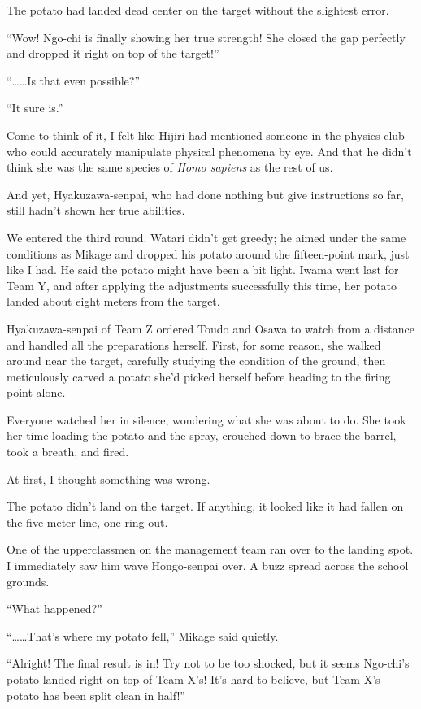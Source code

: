 \documentclass[
    a4paper,
    12pt,
    twoside,
    openany,
    UTF8,
    fontset=windows
]{ctexbook}
\begin{document}
The potato had landed dead center on the target without the slightest error.

``Wow! Ngo-chi is finally showing her true strength! She closed the gap perfectly and dropped it right on top of the target!''

``\dots\dots Is that even possible?''

``It sure is.''

Come to think of it, I felt like Hijiri had mentioned someone in the physics club who could accurately manipulate physical phenomena by eye. And that he didn't think she was the same species of \textit{Homo sapiens} as the rest of us.

And yet, Hyakuzawa-senpai, who had done nothing but give instructions so far, still hadn't shown her true abilities.

We entered the third round. Watari didn't get greedy; he aimed under the same conditions as Mikage and dropped his potato around the fifteen-point mark, just like I had. He said the potato might have been a bit light. Iwama went last for Team Y, and after applying the adjustments successfully this time, her potato landed about eight meters from the target.

Hyakuzawa-senpai of Team Z ordered Toudo and Osawa to watch from a distance and handled all the preparations herself. First, for some reason, she walked around near the target, carefully studying the condition of the ground, then meticulously carved a potato she'd picked herself before heading to the firing point alone.

Everyone watched her in silence, wondering what she was about to do. She took her time loading the potato and the spray, crouched down to brace the barrel, took a breath, and fired.

At first, I thought something was wrong.

The potato didn't land on the target. If anything, it looked like it had fallen on the five-meter line, one ring out.

One of the upperclassmen on the management team ran over to the landing spot. I immediately saw him wave Hongo-senpai over. A buzz spread across the school grounds.

``What happened?''

``\dots\dots That's where my potato fell,'' Mikage said quietly.

``Alright! The final result is in! Try not to be too shocked, but it seems Ngo-chi's potato landed right on top of Team X's! It's hard to believe, but Team X's potato has been split clean in half!''
\end{document}

